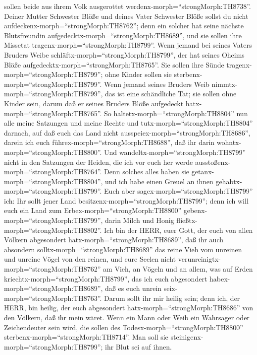 sollen beide aus ihrem Volk ausgerottet
werdenx-morph=``strongMorph:TH8738''.  Deiner Mutter
Schwester Blöße und deines Vater Schwester Blöße sollst du nicht
aufdeckenx-morph=``strongMorph:TH8762''; denn ein solcher hat seine
nächste Blutsfreundin aufgedecktx-morph=``strongMorph:TH8689'', und sie
sollen ihre Missetat tragenx-morph=``strongMorph:TH8799''. 
Wenn jemand bei seines Vaters Bruders Weibe
schläftx-morph=``strongMorph:TH8799'', der hat seines Oheims Blöße
aufgedecktx-morph=``strongMorph:TH8765''. Sie sollen ihre Sünde
tragenx-morph=``strongMorph:TH8799''; ohne Kinder sollen sie
sterbenx-morph=``strongMorph:TH8799''.  Wenn jemand seines
Bruders Weib nimmtx-morph=``strongMorph:TH8799'', das ist eine
schändliche Tat; sie sollen ohne Kinder sein, darum daß er seines
Bruders Blöße aufgedeckt hatx-morph=``strongMorph:TH8765''.
 So haltetx-morph=``strongMorph:TH8804'' nun alle meine
Satzungen und meine Rechte und tutx-morph=``strongMorph:TH8804''
darnach, auf daß euch das Land nicht
ausspeiex-morph=``strongMorph:TH8686'', darein ich euch
führex-morph=``strongMorph:TH8688'', daß ihr darin
wohntx-morph=``strongMorph:TH8800''.  Und
wandeltx-morph=``strongMorph:TH8799'' nicht in den Satzungen der Heiden,
die ich vor euch her werde ausstoßenx-morph=``strongMorph:TH8764''. Denn
solches alles haben sie getanx-morph=``strongMorph:TH8804'', und ich
habe einen Greuel an ihnen gehabtx-morph=``strongMorph:TH8799''.
 Euch aber sagex-morph=``strongMorph:TH8799'' ich: Ihr
sollt jener Land besitzenx-morph=``strongMorph:TH8799''; denn ich will
euch ein Land zum Erbex-morph=``strongMorph:TH8800''
gebenx-morph=``strongMorph:TH8799'', darin Milch und Honig
fließtx-morph=``strongMorph:TH8802''. Ich bin der HERR, euer Gott, der
euch von allen Völkern abgesondert hatx-morph=``strongMorph:TH8689'',
 daß ihr auch absondern solltx-morph=``strongMorph:TH8689''
das reine Vieh vom unreinen und unreine Vögel von den reinen, und eure
Seelen nicht verunreinigtx-morph=``strongMorph:TH8762'' am Vieh, an
Vögeln und an allem, was auf Erden
kriechtx-morph=``strongMorph:TH8799'', das ich euch abgesondert
habex-morph=``strongMorph:TH8689'', daß es euch unrein
seix-morph=``strongMorph:TH8763''.  Darum sollt ihr mir
heilig sein; denn ich, der HERR, bin heilig, der euch abgesondert
hatx-morph=``strongMorph:TH8686'' von den Völkern, daß ihr mein wäret.
 Wenn ein Mann oder Weib ein Wahrsager oder Zeichendeuter
sein wird, die sollen des Todesx-morph=``strongMorph:TH8800''
sterbenx-morph=``strongMorph:TH8714''. Man soll sie
steinigenx-morph=``strongMorph:TH8799''; ihr Blut sei auf ihnen.

